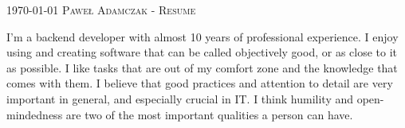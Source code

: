 \documentclass[localFont,alternative,10pt]{yaac-another-awesome-cv}
\begin{document}
  \makecvheader

  \makecvfooter
    {\textsc{\today}}
    {\textsc{Paweł Adamczak - Resume}}
    {\thepage}

  \par{
    I'm a backend developer with almost 10 years of professional experience.
    I enjoy using and creating software that can be called objectively good, or as close to it as possible.
    I like tasks that are out of my comfort zone and the knowledge that comes with them.
    I believe that good practices and attention to detail are very important in general, and especially crucial in IT.
    I think humility and open-mindedness are two of the most important qualities a person can have.
  }

  \vspace{1em}


  \begin{keywords}
  \end{keywords}

\end{document}
